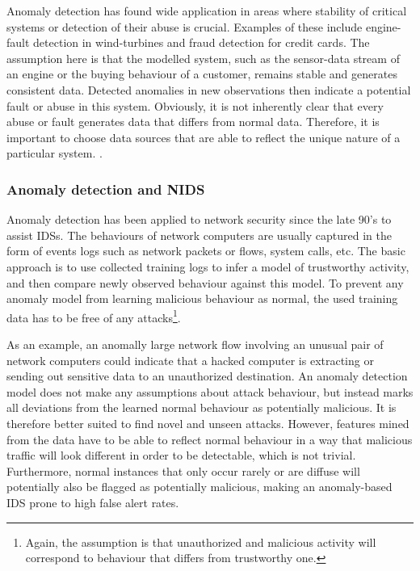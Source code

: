 \documentclass[a4paper,12pt,twoside]{report}
\begin{document}
Anomaly detection has found wide application in areas where stability of  critical systems or detection of their abuse is crucial. Examples of these include engine-fault detection in wind-turbines and fraud detection for credit cards. The assumption here is that the modelled system, such as the sensor-data stream of an engine or the buying behaviour of a customer, remains stable and generates consistent data. Detected anomalies in new observations then indicate a potential fault or abuse in this system. Obviously, it is not inherently clear that every abuse or fault generates data that differs from normal data. Therefore, it is important to choose data sources that are able to reflect the unique nature of a particular system. .

\subsubsection{Anomaly detection and NIDS}

Anomaly detection has been applied to network security since the late 90's to assist IDSs. The behaviours of network computers are usually captured in the form of events logs such as network packets or flows, system calls, etc. The basic approach is to use collected training logs to infer a model of trustworthy activity, and then compare newly observed behaviour against this model.  To prevent any anomaly model from learning malicious behaviour as normal, the used training data has to be free of any attacks\footnote{Again, the assumption is that unauthorized and malicious activity will correspond to behaviour that differs from trustworthy one.}. 

As an example, an anomally large network flow involving an unusual pair of network computers could indicate that a hacked computer is extracting or sending out sensitive data to an unauthorized destination. An anomaly detection model does not make any assumptions about attack behaviour, but instead marks all deviations from the learned normal behaviour as potentially malicious. It is therefore better suited to find novel and unseen attacks. However, features mined from the data have to be able to reflect normal behaviour in a way that malicious traffic will look different in order to be detectable, which is not trivial. Furthermore, normal instances that only occur rarely or are diffuse will potentially also be flagged as potentially malicious, making an anomaly-based IDS prone to high false alert rates.
\end{document}
